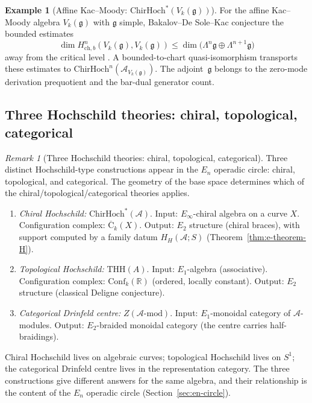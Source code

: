 \documentclass[11pt,reqno]{amsart}
\theoremstyle{definition}
\newtheorem{example}[theorem]{Example}
\theoremstyle{remark}
\newtheorem{remark}[theorem]{Remark}
\providecommand{\cA}{\mathcal{A}}
\providecommand{\fg}{\mathfrak{g}}
\providecommand{\FM}{\overline{\mathrm{C}}}
\providecommand{\Conf}{\mathrm{Conf}}
\providecommand{\Eone}{E_1}
\providecommand{\Etwo}{E_2}
\providecommand{\En}{E_n}
\providecommand{\Einf}{E_\infty}
\providecommand{\ChirHoch}{\mathrm{ChirHoch}}
\providecommand{\THH}{\mathrm{THH}}
\providecommand{\bR}{\mathbb{R}}
\begin{document}
\begin{example}[Affine Kac--Moody: $\ChirHoch^*(V_k(\fg))$]
\label{ex:e-km-chirhoch}
For the affine Kac--Moody algebra $V_k(\fg)$ with
$\fg$ simple, Bakalov--De Sole--Kac conjecture the bounded estimates
\[
 \dim H^n_{\mathrm{ch},b}(V_k(\fg),V_k(\fg))
 \leq
 \dim\bigl(\Lambda^n\fg\oplus\Lambda^{n+1}\fg\bigr)
\]
away from the critical level \cite[Conjecture~7.5]{BDSK21}.  A
bounded-to-chart quasi-isomorphism transports these estimates to
$\ChirHoch^n(\cA_{V_k(\fg)})$.  The adjoint~$\fg$ belongs to the
zero-mode derivation prequotient and the bar-dual generator count.
\end{example}

\subsection{Three Hochschild theories: chiral, topological, categorical}

\begin{remark}[Three Hochschild theories: chiral, topological, categorical]
\label{warn:e-three-hochschild}
Three distinct Hochschild-type constructions appear in the $\En$ operadic circle: chiral, topological, and categorical. The geometry of the base space
determines which of the chiral/topological/categorical theories applies.
\begin{enumerate}[label=\textup{(\roman*)}]
 \item \emph{Chiral Hochschild:}
 $\ChirHoch^*(\cA)$. Input: $\Einf$-chiral algebra on a
 curve $X$. Configuration complex: $\FM_k(X)$. Output:
 $\Etwo$ structure (chiral braces), with support computed by
 a family datum $H_H(\cA;S)$ (Theorem~\ref{thm:e-theorem-H}).
\item \emph{Topological Hochschild:}
 $\THH(A)$. Input: $\Eone$-algebra (associative). Configuration
 complex: $\Conf_k(\bR)$ (ordered, locally constant). Output:
 $\Etwo$ structure (classical Deligne conjecture).
\item \emph{Categorical Drinfeld centre:}
 $Z(\cA\text{-mod})$. Input: $\Eone$-monoidal category of
 $\cA$-modules. Output: $\Etwo$-braided monoidal category
 (the centre carries half-braidings).
\end{enumerate}
Chiral Hochschild lives on algebraic curves; topological
Hochschild lives on $S^1$; the categorical Drinfeld centre lives in the
representation category. The three constructions give different
answers for the same algebra, and their relationship is the
content of the $\En$ operadic circle
(Section~\ref{sec:en-circle}).
\end{remark}
\end{document}
